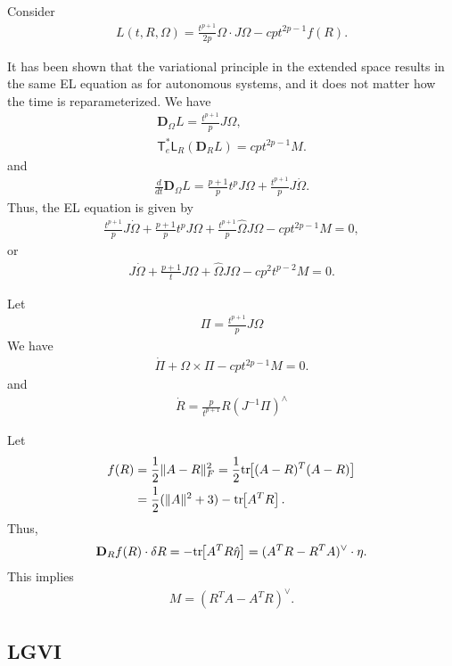 \documentclass[letterpaper, 10pt, conference]{ieeeconf}
\newcommand{\bracket}[1]{\ensuremath{\left[ #1 \right]}}
\newcommand{\tr}[1]{\mbox{tr}\ensuremath{\negthickspace\bracket{#1}}}
\newcommand{\T}{\ensuremath{\mathsf{T}}}
\renewcommand{\L}{\ensuremath{\mathsf{L}}}
\newcommand{\D}{\ensuremath{\mathbf{D}}}
\begin{document}
Consider
\begin{align*}
    L(t,R,\Omega) = \frac{t^{p+1}}{2p} \Omega\cdot J\Omega - cpt^{2p-1} f(R).
\end{align*}

It has been shown that the variational principle in the extended space results in the same EL equation as for autonomous systems, and it does not matter how the time is reparameterized. 
We have
\begin{align*}
    \D_\Omega L = \frac{t^{p+1}}{p} J\Omega,\\
    \T^*_e \L_R( \D_R L) = cpt^{2p-1} M.
\end{align*}
and
\begin{align*}
    \frac{d}{dt} \D_\Omega L = \frac{p+1}{p} t^p J\Omega + \frac{t^{p+1}}{p} J\dot\Omega.
\end{align*}
Thus, the EL equation is given by
\begin{align*}
    \frac{t^{p+1}}{p} J\dot\Omega + \frac{p+1}{p} t^p J\Omega + \frac{t^{p+1}}{p} \hat\Omega J\Omega - cpt^{2p-1} M = 0,
\end{align*}
or
\begin{align*}
    J\dot\Omega + \frac{p+1}{t} J\Omega + \hat\Omega J\Omega - c p^2 t^{p-2} M = 0.
\end{align*}

Let
\begin{align*}
\Pi = \frac{t^{p+1}}{p} J\Omega
\end{align*}
We have
\begin{align*}
    \dot \Pi + \Omega\times \Pi - cpt^{2p-1} M = 0.
\end{align*}
and
\begin{align*}
    \dot R = \frac{p}{t^{p+1}} R (J^{-1}\Pi)^\wedge
\end{align*}


Let 
\begin{align*}
    f(R) & = \frac{1}{2}\| A- R\|^2_F = \frac{1}{2} \tr{(A-R)^T(A-R)}  \\
         & =\frac{1}{2}(\|A\|^2 + 3) - \tr{A^T R}.
\end{align*}
Thus,
\begin{align*}
    \D_R f(R) \cdot \delta R = -\tr{A^T R\hat\eta} = (A^T R- R^T A)^\vee \cdot \eta.
\end{align*}
This implies
\begin{align*}
    M = (R^T A-A^T R)^\vee.
\end{align*}

\subsection{LGVI}
\end{document}
